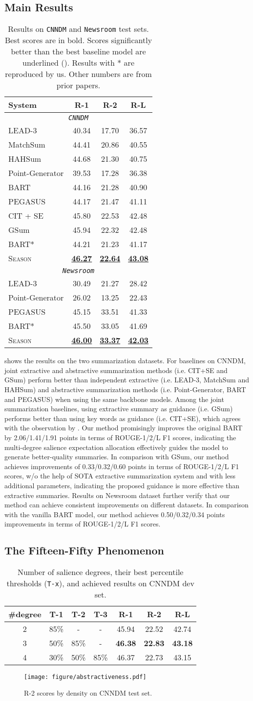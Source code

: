 \documentclass[11pt]{article}
\newcommand{\MODEL}{\mbox{\textsc{Season}}\xspace}
\newcommand{\TABLEMAIN}{
    \begin{table}[t!]
        \centering
        \small
        \begin{tabular}{lccc}
            \toprule 
            \textbf{System} & \textbf{R-1} & \textbf{R-2} & \textbf{R-L}  \\\midrule
            \multicolumn{4}{c}{\textit{\texttt{CNNDM}}} \\\midrule
            LEAD-3 & 40.34 & 17.70 & 36.57 \\
            MatchSum & 44.41 & 20.86 & 40.55 \\
            HAHSum & 44.68 & 21.30 & 40.75 \\ \midrule
            Point-Generator & 39.53 & 17.28 & 36.38 \\
            BART & 44.16 & 21.28 & 40.90 \\
            PEGASUS & 44.17 & 21.47 & 41.11 \\ 
            CIT + SE &45.80 & 22.53 &42.48  \\
            GSum & 45.94 & 22.32 & 42.48 \\\midrule
            BART* & 44.21 &21.23 &41.17 \\
            
            \MODEL &  \underline{\textbf{46.27}} & \underline{\textbf{22.64}} & \underline{\textbf{43.08}} \\
            \midrule \multicolumn{4}{c}{\textit{\texttt{Newsroom}}} \\\midrule
            LEAD-3 & 30.49 & 21.27 & 28.42 \\ \midrule
            Point-Generator & 26.02 & 13.25 & 22.43 \\
            PEGASUS & 45.15 & 33.51 & 41.33\\\midrule
            BART* & 45.50	&33.05	&41.69\\
            \MODEL &  \underline{\textbf{46.00}}	& \underline{\textbf{33.37}}	& \underline{\textbf{42.03}} \\
            \bottomrule
        \end{tabular}
        \caption{\small Results on \texttt{CNNDM} and \texttt{Newsroom} test sets.
        Best scores are in bold.  Scores significantly better than the best baseline model are underlined ().
        Results with * are reproduced by us.
        Other numbers are from prior papers. 
        }
        \label{tab:main} 
        \vspace{-0.5em}
    \end{table}
}
\newcommand{\TABLESALIENCETHRESHOLDCNNDM}{
    \begin{table}[!t]\centering
        \small
        \setlength{\tabcolsep}{5pt}
        \begin{tabular}{cccc|ccc}\toprule
            \textbf{\#degree} &\textbf{T-1} &\textbf{T-2} &\textbf{T-3} &\textbf{R-1} &\textbf{R-2} &\textbf{R-L}
            \\\midrule
            2 & 85\% & - & - & 45.94 & 22.52 & 42.74 \\
            3 & 50\% &  85\% & - & \textbf{46.38} & \textbf{22.83} & \textbf{43.18}  \\
            4 & 30\% & 50\% &  85\%  & 46.37 & 22.73 & 43.15 \\\bottomrule
        \end{tabular}
        \caption{\small Number of salience degrees, their best percentile thresholds (\texttt{T-x}), and achieved results on CNNDM dev set. }
        \label{tab:threshold}
        \vspace{-0.5em}
    \end{table}
}
\newcommand{\FIGURECNNDMSUBSETS}{
    \begin{figure}[t]
      \begin{center}
        \texttt{[image: figure/abstractiveness.pdf]} \end{center}
      \caption{\small R-2 scores by density on CNNDM test set.
      }
      \label{fig:cnndm_subsets}
      \vspace{-0.5em}
    \end{figure}
}
\begin{document}
\subsection{Main Results}
\label{sec:main_result}
\TABLEMAIN
{} shows the results on the two summarization datasets.
For baselines on CNNDM, joint extractive and abstractive summarization methods (i.e. CIT+SE and GSum) perform better than independent extractive (i.e. LEAD-3, MatchSum and HAHSum) and abstractive summarization methods (i.e. Point-Generator, BART and PEGASUS) when using the same backbone models. 
Among the joint summarization baselines, using extractive summary as guidance (i.e. GSum) performs better than using key words as guidance (i.e. CIT+SE), which agrees with the observation by \citet{dou2021gsum}. 
Our method promisingly improves the
original BART by 2.06/1.41/1.91 points in terms of ROUGE-1/2/L F1 scores, indicating the multi-degree salience expectation allocation effectively guides the model to generate better-quality summaries.
In comparison with GSum, our method achieves improvements of 0.33/0.32/0.60 points in terms of ROUGE-1/2/L F1 scores, w/o the help of SOTA extractive summarization system and with less additional parameters, indicating the proposed guidance is more effective than extractive summaries.
Results on Newsroom dataset further verify that our method can achieve consistent improvements on different datasets. In comparison with the vanilla BART model, our method achieves 0.50/0.32/0.34 points improvements in terms of ROUGE-1/2/L F1 scores.




\subsection{The Fifteen-Fifty Phenomenon}
\label{sec:principle}
\TABLESALIENCETHRESHOLDCNNDM
\FIGURECNNDMSUBSETS
\end{document}

